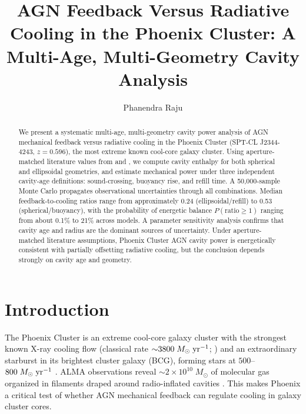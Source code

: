 \documentclass[twocolumn]{aastex63}
\newcommand{\Msun}{M_{\odot}}
\newcommand{\yr}{\rm yr}
\begin{document}
\title{AGN Feedback Versus Radiative Cooling in the Phoenix Cluster:
       A Multi-Age, Multi-Geometry Cavity Analysis}

\author[0009-0003-0654-6290]{Phanendra Raju}


\begin{abstract}
We present a systematic multi-age, multi-geometry cavity power analysis
of AGN mechanical feedback versus radiative cooling in the Phoenix Cluster (SPT-CL J2344-4243,
$z = 0.596$), the most extreme known cool-core galaxy cluster. Using
aperture-matched literature values from \citet{McDonald2012, McDonald2015,
McDonald2019} and \citet{Hlavacek-Larrondo2015}, we compute cavity enthalpy
for both spherical and ellipsoidal geometries, and estimate mechanical power
under three independent cavity-age definitions: sound-crossing, buoyancy rise,
and refill time. A 50,000-sample Monte Carlo propagates observational
uncertainties through all combinations. Median feedback-to-cooling ratios
range from approximately 0.24 (ellipsoidal/refill) to 0.53
(spherical/buoyancy), with the probability of energetic balance
$P(\mathrm{ratio} \geq 1)$ ranging from about 0.1\% to 21\% across models.
A parameter sensitivity analysis confirms that cavity age and radius are the
dominant sources of uncertainty. Under aperture-matched literature assumptions,
Phoenix Cluster AGN cavity power is energetically consistent with partially
offsetting radiative cooling, but the conclusion depends strongly on cavity
age and geometry.
\end{abstract}

\section{Introduction}
\label{sec:intro}

The Phoenix Cluster is an extreme cool-core galaxy cluster with the strongest
known X-ray cooling flow (classical rate ${\sim}3800\;\Msun\;\yr^{-1}$;
\citealt{McDonald2012}) and an extraordinary starburst in its brightest cluster
galaxy (BCG), forming stars at $500$--$800\;\Msun\;\yr^{-1}$
\citep{McDonald2012, McDonald2015}. ALMA observations reveal
${\sim}2 \times 10^{10}\;\Msun$ of molecular gas organized in filaments draped
around radio-inflated cavities \citep{Russell2017}. This makes Phoenix a critical
test of whether AGN mechanical feedback can regulate cooling in galaxy cluster
cores.
\end{document}
